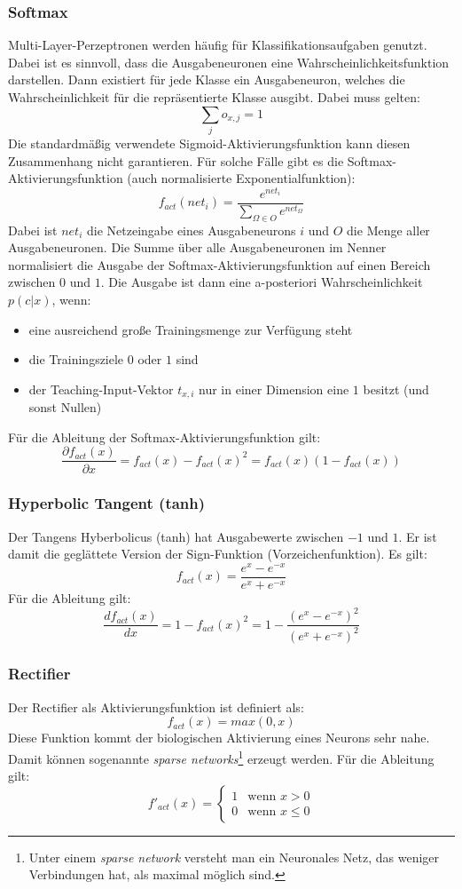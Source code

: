 \subsubsection*{Softmax}
Multi-Layer-Perzeptronen werden häufig für Klassifikationsaufgaben genutzt. Dabei ist es sinnvoll, dass die Ausgabeneuronen eine Wahrscheinlichkeitsfunktion darstellen. Dann existiert für jede Klasse ein Ausgabeneuron, welches die Wahrscheinlichkeit für die repräsentierte Klasse ausgibt. Dabei muss gelten:
\[
	\sum_{j} o_{x,j} = 1
\]
Die standardmäßig verwendete Sigmoid-Aktivierungsfunktion kann diesen Zusammenhang nicht garantieren.
Für solche Fälle gibt es die Softmax-Aktivierungsfunktion (auch normalisierte Exponentialfunktion):
\[
	f_{act}(net_i) = \frac{e^{net_i}}{\sum_{\Omega \in O} e^{net_{\Omega}}}
\]
Dabei ist $net_i$ die Netzeingabe eines Ausgabeneurons $i$ und $O$ die Menge aller Ausgabeneuronen. Die Summe über alle Ausgabeneuronen im Nenner normalisiert die Ausgabe der Softmax-Aktivierungsfunktion auf einen Bereich zwischen $0$ und $1$.
Die Ausgabe ist dann eine a-posteriori Wahrscheinlichkeit $p(c | x)$, wenn:
\begin{itemize}
	\item eine ausreichend große Trainingsmenge zur Verfügung steht
	\item die Trainingsziele $0$ oder $1$ sind
	\item der Teaching-Input-Vektor $t_{x,i}$ nur in einer Dimension eine $1$ besitzt (und sonst Nullen)
\end{itemize}
Für die Ableitung der Softmax-Aktivierungsfunktion gilt:
\[
	\frac{\partial f_{act}(x)}{\partial x} 
		= f_{act}(x) - f_{act}(x)^2
		= f_{act}(x) (1 - f_{act}(x))
\]

\subsubsection*{Hyperbolic Tangent (tanh)}
Der Tangens Hyberbolicus (tanh) hat Ausgabewerte zwischen $-1$ und $1$. Er ist damit die geglättete Version der Sign-Funktion (Vorzeichenfunktion). Es gilt:
\[
	f_{act}(x) = \frac{e^x - e^{-x}}{e^x + e^{-x}}
\]
Für die Ableitung gilt:
\[
	\frac{d f_{act}(x)}{dx} =
		1 - f_{act}(x)^2 = 1 - \frac{(e^x - e^{-x})^2}{(e^x + e^{-x})^2}
\]

\subsubsection*{Rectifier}
Der Rectifier als Aktivierungsfunktion ist definiert als:
\[
	f_{act}(x) = max(0, x)
\]
Diese Funktion kommt der biologischen Aktivierung eines Neurons sehr nahe. Damit können sogenannte \emph{sparse networks}\footnote{Unter einem \emph{sparse network} versteht man ein Neuronales Netz, das weniger Verbindungen hat, als maximal möglich sind.} erzeugt werden.
Für die Ableitung gilt:
\[
	f'_{act}(x) = 
	\begin{cases}
		1 &\text{wenn } x > 0 \\
		0 &\text{wenn } x \le 0
	\end{cases}
\]

